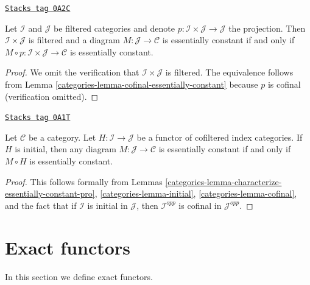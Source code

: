 \begin{lemma}
\label{categories-lemma-essentially-constant-over-product}
\href{https://stacks.math.columbia.edu/tag/0A2C}{\texttt{Stacks tag 0A2C}}

Let $\mathcal{I}$ and $\mathcal{J}$ be filtered categories and denote
$p : \mathcal{I} \times \mathcal{J} \to \mathcal{J}$ the projection.
Then $\mathcal{I} \times \mathcal{J}$ is filtered and a diagram
$M : \mathcal{J} \to \mathcal{C}$ is essentially constant if and only
if $M \circ p : \mathcal{I} \times \mathcal{J} \to \mathcal{C}$
is essentially constant.
\end{lemma}

\begin{proof}

We omit the verification that $\mathcal{I} \times \mathcal{J}$ is
filtered. The equivalence follows from
Lemma \ref{categories-lemma-cofinal-essentially-constant}
because $p$ is cofinal (verification omitted).
\end{proof}

\begin{lemma}
\label{categories-lemma-initial-essentially-constant}
\href{https://stacks.math.columbia.edu/tag/0A1T}{\texttt{Stacks tag 0A1T}}

Let $\mathcal{C}$ be a category. Let $H : \mathcal{I} \to \mathcal{J}$
be a functor of cofiltered index categories. If $H$ is initial, then
any diagram $M : \mathcal{J} \to \mathcal{C}$ is essentially constant
if and only if $M \circ H$ is essentially constant.
\end{lemma}

\begin{proof}

This follows formally from
Lemmas \ref{categories-lemma-characterize-essentially-constant-pro},
\ref{categories-lemma-initial}, \ref{categories-lemma-cofinal}, and
the fact that if $\mathcal{I}$ is initial in $\mathcal{J}$,
then $\mathcal{I}^{opp}$ is cofinal in $\mathcal{J}^{opp}$.
\end{proof}

\section{Exact functors}
\label{categories-section-exact-functor}
In this section we define exact functors.

